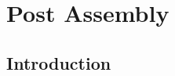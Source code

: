 \documentclass[main]{subfiles}
\begin{document}
\chapter{Post Assembly}

\section{Introduction}

\end{document}
